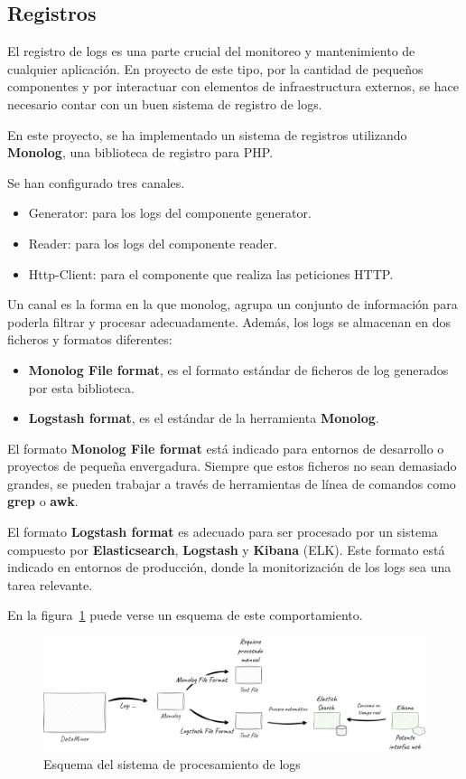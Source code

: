 \subsection*{Registros}

El registro de logs es una parte crucial del monitoreo y mantenimiento de cualquier aplicación.
En proyecto de este tipo, por la cantidad de pequeños componentes y por interactuar con elementos de infraestructura
externos, se hace necesario contar con un buen sistema de registro de logs.

En este proyecto, se ha implementado un sistema de registros utilizando \textbf{Monolog}, una biblioteca de registro
para PHP.

Se han configurado tres canales.

\begin{itemize}
    \item Generator: para los logs del componente generator.
    \item Reader: para los logs del componente reader.
    \item Http-Client: para el componente que realiza las peticiones HTTP.
\end{itemize}

Un canal es la forma en la que monolog, agrupa un conjunto de información para poderla filtrar y procesar adecuadamente.
Además, los logs se almacenan en dos ficheros y formatos diferentes:

\begin{itemize}
    \item \textbf{Monolog File format}, es el formato estándar de ficheros de log generados por esta biblioteca.
    \item \textbf{Logstash format}, es el estándar de la herramienta \textbf{Monolog}.
\end{itemize}

El formato \textbf{Monolog File format} está indicado para entornos de desarrollo o proyectos de pequeña envergadura.
Siempre que estos ficheros no sean demasiado grandes, se pueden trabajar a través de herramientas de línea de comandos
como \textbf{grep} o \textbf{awk}.

El formato \textbf{Logstash format} es adecuado para ser procesado por un sistema compuesto por
\textbf{Elasticsearch}, \textbf{Logstash} y \textbf{Kibana} (ELK).
Este formato está indicado en entornos de producción, donde la monitorización de los logs sea una tarea relevante.

En la figura~\ref{fig:chapter_4.4.logs_overview} puede verse un esquema de este comportamiento.

\begin{figure}[ht]
    \begin{center}
        \includegraphics[width=\textwidth]{./chapter/4/images/chapter_4.4.logs_overview}
        \caption{Esquema del sistema de procesamiento de logs}
        \label{fig:chapter_4.4.logs_overview}
    \end{center}
\end{figure}
